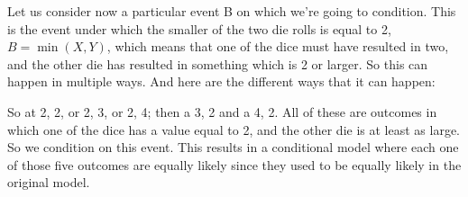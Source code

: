 \documentclass[pdftex, brazil, 12pt, twoside]{article}
\begin{document}
\begin{figure}[H]
  \begin{center}
  \end{center}
\end{figure}

Let us consider now a particular event B on which
we're going to condition.
This is the event under which the smaller of the two die
rolls is equal to 2, $B = \min(X, Y)$, which means that one of the dice
must have resulted in two, and the other die has resulted in
something which is 2 or larger.
So this can happen in multiple ways.
And here are the different ways that it can happen:

\begin{figure}[H]
  \begin{center}
  \end{center}
\end{figure}

So at 2, 2, or 2, 3, or 2, 4; then a 3, 2 and a 4, 2.
All of these are outcomes in which one of the dice has a
value equal to 2, and the other die
is at least as large.
So we condition on this event.
This results in a conditional model where each one of those
five outcomes are equally likely since they used to be
equally likely in the original model.
\end{document}
